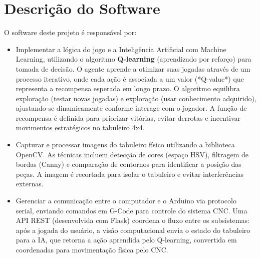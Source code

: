 \documentclass[a4paper,12pt]{article}
\begin{document}
\clearpage
\vspace{1em}

\section{Descrição do Software}
O software deste projeto é responsável por:
\begin{itemize}
    \item Implementar a lógica do jogo e a Inteligência Artificial com Machine Learning, utilizando o algoritmo \textbf{Q-learning} (aprendizado por reforço) para tomada de decisão. O agente aprende a otimizar suas jogadas através de um processo iterativo, onde cada ação é associada a um valor (*Q-value*) que representa a recompensa esperada em longo prazo. O algoritmo equilibra exploração (testar novas jogadas) e exploração (usar conhecimento adquirido), ajustando-se dinamicamente conforme interage com o jogador. A função de recompensa é definida para priorizar vitórias, evitar derrotas e incentivar movimentos estratégicos no tabuleiro 4x4.
    
    \item Capturar e processar imagens do tabuleiro físico utilizando a biblioteca OpenCV. As técnicas incluem detecção de cores (espaço HSV), filtragem de bordas (Canny) e comparação de contornos para identificar a posição das peças. A imagem é recortada para isolar o tabuleiro e evitar interferências externas.
    
    \item Gerenciar a comunicação entre o computador e o Arduino via protocolo serial, enviando comandos em G-Code para controle do sistema CNC. Uma API REST (desenvolvida com Flask) coordena o fluxo entre os subsistemas: após a jogada do usuário, a visão computacional envia o estado do tabuleiro para a IA, que retorna a ação aprendida pelo Q-learning, convertida em coordenadas para movimentação física pelo CNC.
\end{itemize}
\end{document}
